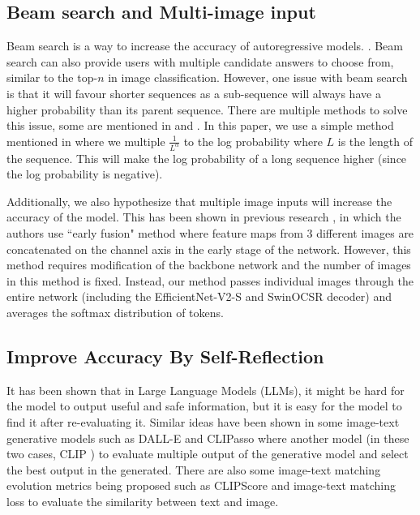 \documentclass{article}
\begin{document}
\subsection{Beam search and Multi-image input}
Beam search is a way to increase the accuracy of autoregressive models. \autocite{yang_breaking_2018} \autocite{zhang_beam_2024}. Beam search can also provide users with multiple candidate answers to choose from, similar to the top-$n$ in image classification. However, one issue with beam search is that it will favour shorter sequences as a sub-sequence will always have a higher probability than its parent sequence. \autocite{yang_breaking_2018} \autocite{zhang_beam_2024} There are multiple methods to solve this issue, some are mentioned in \autocite{yang_breaking_2018} and \autocite{zhang_beam_2024}. In this paper, we use a simple method mentioned in \autocite{zhang_beam_2024} where we multiple  $\frac{1}{L^\alpha}$ to the log probability where $L$ is the length of the sequence. This will make the log probability of a long sequence higher (since the log probability is negative). 

Additionally, we also hypothesize that multiple image inputs will increase the accuracy of the model. This has been shown in previous research \autocite{sun_multi-input_2017}, in which the authors use ``early fusion" method where feature maps from 3 different images are concatenated on the channel axis in the early stage of the network. However, this method requires modification of the backbone network and the number of images in this method is fixed. Instead, our method passes individual images through the entire network (including the EfficientNet-V2-S and SwinOCSR decoder) and averages the softmax distribution of tokens.  


\subsection{Improve Accuracy By Self-Reflection}
It has been shown that in Large Language Models (LLMs), it might be hard for the model to output useful and safe information, but it is easy for the model to find it after re-evaluating it. \autocite{bai_constitutional_2022} Similar ideas have been shown in some image-text generative models such as DALL-E \autocite{ramesh_zero-shot_2021} and CLIPasso \autocite{vinker_clipasso_2022} where another model (in these two cases, CLIP \autocite{radford_learning_2021}) to evaluate multiple output of the generative model and select the best output in the generated. There are also some image-text matching evolution metrics being proposed such as CLIPScore \autocite{hessel_clipscore:_2022} and image-text matching loss \autocite{xu_attngan:_2017} to evaluate the similarity between text and image. 
\end{document}
